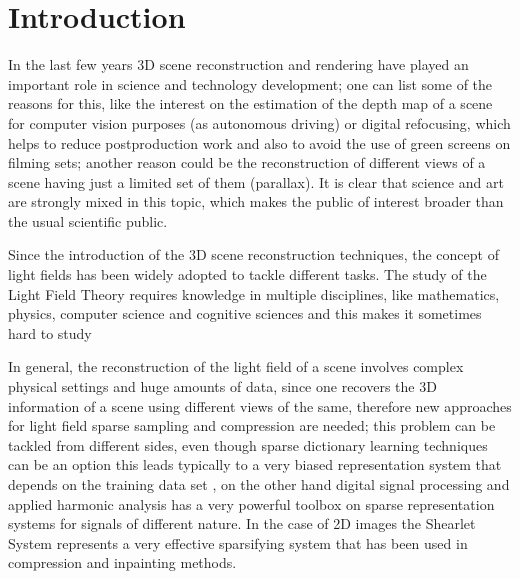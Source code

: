 \chapter{Introduction}

In the last few years 3D scene reconstruction and rendering have played an important role in science and technology development; one can list some of the reasons for this, like the interest on the estimation of the depth map of a scene for computer vision purposes (as autonomous driving) or digital refocusing, which helps to reduce postproduction work and also to avoid the use of green screens on filming sets; another reason could be the reconstruction of different views of a scene having just a limited set of them (parallax). It is clear that science and art are strongly mixed in this topic, which makes the public of interest broader than the usual scientific public. 

\bigskip

Since the introduction of the 3D scene reconstruction techniques, the concept of light fields has been widely adopted to tackle different tasks. The study of the Light Field Theory requires knowledge in multiple disciplines, like mathematics, physics, computer science and cognitive sciences and this makes it sometimes hard to study

\bigskip

In general, the reconstruction of the light field of a scene involves complex physical settings and huge amounts of data, since one recovers the 3D information of a scene using different views of the same, therefore new approaches for light field sparse sampling and compression are needed; this problem can be tackled from different sides, even though sparse dictionary learning techniques can be an option this leads typically to a very biased representation system that depends on the training data set \cite{CompressedMIT}, on the other hand digital signal processing and applied harmonic analysis has a very powerful toolbox on sparse representation systems for signals of different nature. In the case of 2D images the Shearlet System \cite{IntroShearlets} represents a very effective sparsifying system that has been used in compression and inpainting methods. 

\bigskip

